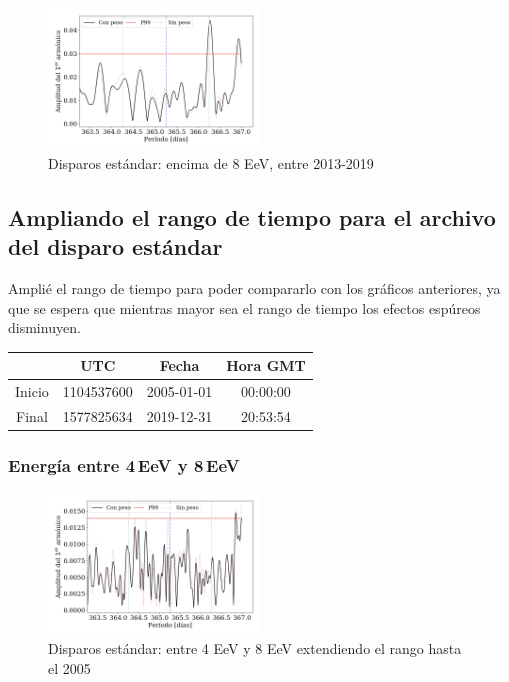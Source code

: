 \begin{figure}[H]
	\centering
	\includegraphics[width=0.5\textwidth]{2019_Main_Array_8_EeV_con_vs_sin_peso.png}
	\caption{Disparos estándar: encima de 8 EeV, entre 2013-2019}
	\label{fig:8w}
\end{figure}




\subsection{Ampliando el rango de tiempo para el archivo del disparo estándar}

Amplié el rango de tiempo para poder compararlo con los gráficos anteriores, ya que se espera que mientras mayor sea el rango de tiempo los efectos espúreos disminuyen.

	\begin{table}[H]
	\centering
		\begin{tabular}{c|c|c|c}
	 		& UTC 			& Fecha		 	&  Hora GMT  \\ \hline
	Inicio	& 1104537600	&2005-01-01 	&00:00:00		\\
	Final 	& 1577825634	&2019-12-31 	&20:53:54		\\
		\end{tabular}
	\end{table}


\subsubsection{Energía entre 4\,EeV y 8\,EeV}

\begin{figure}[H]
	\centering
	\includegraphics[width=0.5\textwidth]{2019_Main_Array_4_8_EeV_con_vs_sin_peso_extended.png}
	\caption{Disparos estándar: entre 4 EeV y 8 EeV extendiendo el rango hasta el 2005}
	\label{fig:48w_extended}
\end{figure}

